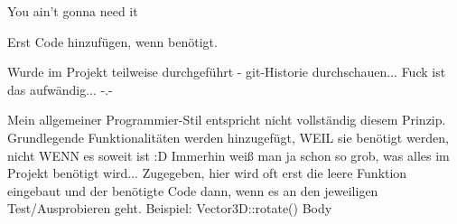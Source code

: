 



You ain't gonna need it

Erst Code hinzufügen, wenn benötigt.

Wurde im Projekt teilweise durchgeführt - git-Historie durchschauen... Fuck ist das aufwändig... -.-

Mein allgemeiner Programmier-Stil entspricht nicht vollständig diesem Prinzip.
Grundlegende Funktionalitäten werden hinzugefügt, WEIL sie benötigt werden, nicht WENN es soweit ist :D
Immerhin weiß man ja schon so grob, was alles im Projekt benötigt wird... Zugegeben, hier wird oft erst die leere Funktion eingebaut und der benötigte Code dann, wenn es an den jeweiligen Test/Ausprobieren geht.
Beispiel: Vector3D::rotate() Body

